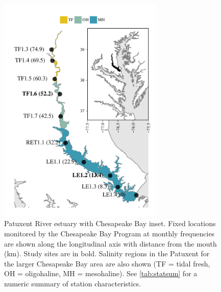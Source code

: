 \documentclass[letterpaper,12pt,oneside]{article}\usepackage[]{graphicx}\usepackage[]{color}
\begin{document}
\begin{figure}[!ht]

{\centering \includegraphics[width=0.7\textwidth]{figs/map-1} 

}

\caption{Patuxent River estuary with Chesapeake Bay inset. Fixed locations monitored by the Chesapeake Bay Program at monthly frequencies are shown along the longitudinal axis with distance from the mouth (km).  Study sites are in bold. Salinity regions in the Patuxent for the larger Chesapeake Bay area are also shown (TF = tidal fresh, OH = oligohaline, MH = mesohaline). See \cref{tab:statsum} for a numeric summary of station characteristics.}\label{fig:map}
\end{figure}
\end{document}
